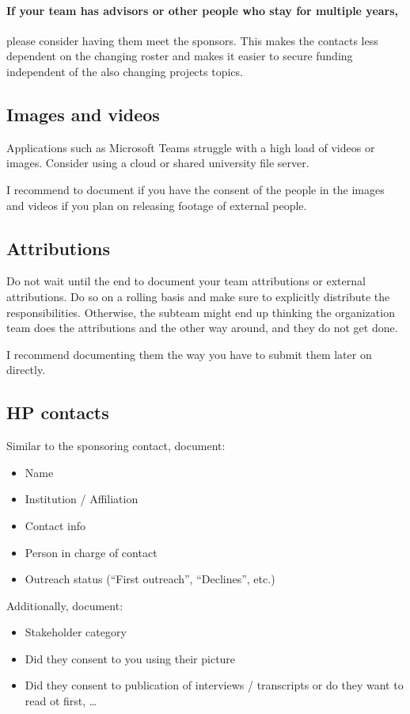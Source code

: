 \paragraph{If your team has advisors or other people who stay for multiple years,} please consider having them meet
the sponsors.
This makes the contacts less dependent on the changing roster and makes it easier to secure funding independent of
the also changing projects topics.

\subsection{Images and videos}\label{subsec:images-and-videos}
Applications such as Microsoft Teams struggle with a high load of videos or images.
Consider using a cloud or shared
university file server.

I recommend to document if you have the consent of the people in the images and videos if you plan on releasing
footage of external people.

\subsection{Attributions}\label{subsec:attributions}
Do not wait until the end to document your team attributions or external attributions.
Do so on a rolling basis and
make sure to explicitly distribute the responsibilities.
Otherwise, the subteam might end up thinking the
organization team does the attributions and the other way around, and they do not get done.

I recommend documenting them the way you have to submit them later on directly.

\subsection{HP contacts}\label{subsec:hp-contacts}
Similar to the sponsoring contact, document:
\begin{itemize}
    \item Name
    \item Institution / Affiliation
    \item Contact info
    \item Person in charge of contact
    \item Outreach status (``First outreach'', ``Declines'', etc.)
\end{itemize}
Additionally, document:
\begin{itemize}
    \item Stakeholder category
    \item Did they consent to you using their picture
    \item Did they consent to publication of interviews / transcripts or do they want to read ot first, \ldots
\end{itemize}

